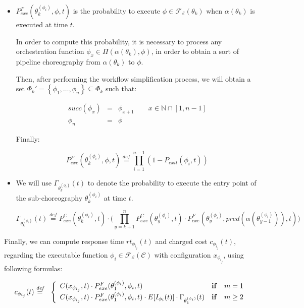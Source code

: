\documentclass[12pt,a4paper]{report}
\newcommand{\mathDef}{\overset{\textit{def}}{=}}
\newcommand{\N}{\mathbb{N}}
\newcommand{\SetFromOneTo}[1]{\N \cap \left[1,#1\right]}
\begin{document}
\begin{itemize}
	
	\item $P_{exe}^F(\theta^{(\phi_i)}_k, \phi, t)$ is the probability to execute $\phi \in \mathscr{F_E}(\theta_k)$ when $\alpha(\theta_k)$ is executed at time $t$. 
	
	In order to compute this probability, it is necessary to process any orchestration function $\phi_x \in \Pi(\alpha(\theta_k),\phi)$, in order to obtain a sort of pipeline choreography from $\alpha(\theta_k)$ to $\phi$.
	
	Then, after performing the workflow simplification process, we will obtain a set $\Phi_k' = \left\{\phi_1, \ldots, \phi_n \right\} \subseteq \Phi_k$ such that:
	
	\begin{eqnarray}
		succ(\phi_x) & = &  \phi_{x+1}  \qquad x \in \SetFromOneTo{n -1} \\ \phi_n & = & \phi
	\end{eqnarray}
	
	Finally:
		
	\begin{equation}
		P_{exe}^F(\theta^{(\phi_i)}_k, \phi, t) \mathDef \prod_{i = 1}^{n-1} (1 - P_{exit}(\phi_i,t))
	\end{equation}
	


\item We will use $\Gamma_{\theta_k^{(\phi_{i})}}(t)$ to denote the probability to execute the entry point of the sub-choreography $\theta_k^{(\phi_{i})}$ at time $t$.

\begin{equation}
	\Gamma_{\theta_k^{(\phi_{i})}}(t) \mathDef P_{exe}^C(\theta^{(\phi_i)}_{k},t) \cdot \Bigg( \prod_{y = k + 1}^{n}  P_{exe}^C(\theta^{(\phi_i)}_{y},t) \cdot P_{exe}^{F}(\theta^{(\phi_i)}_{y}, pred(\alpha(\theta^{(\phi_i)}_{y-1})),t) \Bigg)
\end{equation}

\end{itemize}

Finally, we can compute response time $rt_{\phi_{i_{j}}}(t)$ and charged cost $c_{\phi_{i_{j}}}(t)$, regarding the executable function $\phi_i \in \mathscr{F_E}(\mathcal{C})$ with configuration $x_{\phi_{i_{j}}}$, using following formulas:

\begin{eqnarray}
	c_{\phi_{i_{j}}}(t) & \mathDef & \left\{ 
	\begin{array}{lcl}
		C(x_{\phi_{i_{j}}},t) \cdot P_{exe}^{F}(\theta^{(\phi_i)}_1, \phi_i,t) & \text{\textbf{if}} & m = 1 \nonumber\\ 
		C(x_{\phi_{i_{j}}},t) \cdot P_{exe}^{F}(\theta^{(\phi_i)}_1, \phi_i,t) \cdot E[I_{\phi_i}(t)] \cdot \Gamma_{\theta_1^{(\phi_{i})}}(t) & \text{\textbf{if}} & m \geq 2 \\ 
	\end{array} \right.\label{cost}\\
\end{eqnarray}
\end{document}
